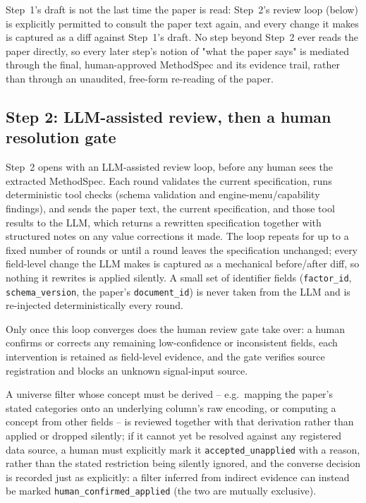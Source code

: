 Step~1's draft is not the last time the paper is read: Step~2's review loop
(below) is explicitly permitted to consult the paper text again, and every
change it makes is captured as a diff against Step~1's draft. No step beyond
Step~2 ever reads the paper directly, so every later step's notion of "what
the paper says" is mediated through the final, human-approved MethodSpec and
its evidence trail, rather than through an unaudited, free-form re-reading of
the paper.

\subsection{Step 2: LLM-assisted review, then a human resolution gate}

Step~2 opens with an LLM-assisted review loop, before any human sees the
extracted MethodSpec. Each round validates the current specification, runs
deterministic tool checks (schema validation and engine-menu/capability
findings), and sends the paper text, the current specification, and those
tool results to the LLM, which returns a rewritten specification together
with structured notes on any value corrections it made. The loop repeats for
up to a fixed number of rounds or until a round leaves the specification
unchanged; every field-level change the LLM makes is captured as a mechanical
before/after diff, so nothing it rewrites is applied silently. A small set of
identifier fields (\texttt{factor\_id}, \texttt{schema\_version}, the paper's
\texttt{document\_id}) is never taken from the LLM and is re-injected
deterministically every round.

Only once this loop converges does the human review gate take over: a human
confirms or corrects any remaining low-confidence or inconsistent fields,
each intervention is retained as field-level evidence, and the gate verifies
source registration and blocks an unknown signal-input source.

A universe filter whose concept must be derived -- e.g.\ mapping the paper's
stated categories onto an underlying column's raw encoding, or computing a
concept from other fields -- is reviewed together with that derivation
rather than applied or dropped silently; if it cannot yet be resolved
against any registered data source, a human must explicitly mark it
\texttt{accepted\_unapplied} with a reason, rather than the stated
restriction being silently ignored, and the converse decision is recorded
just as explicitly: a filter inferred from indirect evidence can instead be
marked \texttt{human\_confirmed\_applied} (the two are mutually exclusive).

